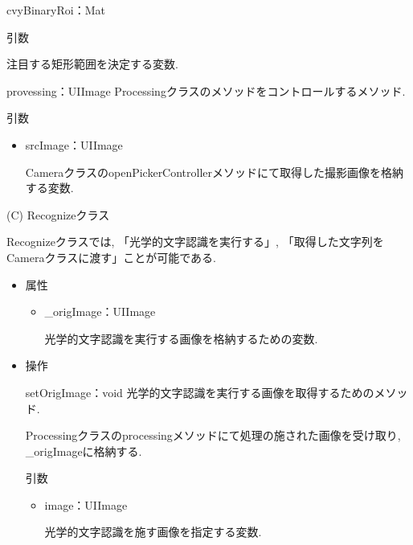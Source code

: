 \begin{description}
\begin{itemize}
\begin{itembox}[l]{cvyBinaryRoi：Mat}
\begin{itembox}[l]{引数}
\begin{itemize}
注目する矩形範囲を決定する変数.
\end{itemize}
\end{itembox}
\end{itembox}

\begin{itembox}[l]{provessing：UIImage}
Processingクラスのメソッドをコントロールするメソッド.

\begin{itembox}[l]{引数}
\begin{itemize}
\item srcImage：UIImage

CameraクラスのopenPickerControllerメソッドにて取得した撮影画像を格納する変数.
\end{itemize}
\end{itembox}
\end{itembox}
\end{itemize}

\newpage

\item (C) Recognizeクラス

Recognizeクラスでは, 「光学的文字認識を実行する」, 「取得した文字列をCameraクラスに渡す」ことが可能である.

\begin{itemize}
\item 属性

\begin{breakbox}
\begin{itemize}
\item \_origImage：UIImage

光学的文字認識を実行する画像を格納するための変数.
\end{itemize}
\end{breakbox}

\item 操作

\begin{itembox}[l]{setOrigImage：void}
光学的文字認識を実行する画像を取得するためのメソッド.

Processingクラスのprocessingメソッドにて処理の施された画像を受け取り, \_origImageに格納する.

\begin{itembox}[l]{引数}
\begin{itemize}
\item image：UIImage

光学的文字認識を施す画像を指定する変数.
\end{itemize}
\end{itembox}
\end{itembox}


\end{itemize}
\end{description}
